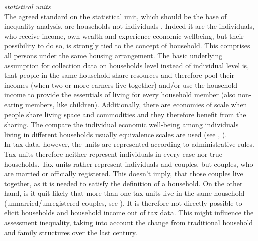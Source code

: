 \documentclass[twoside]{article}\usepackage[]{graphicx}\usepackage[]{color}
\begin{document}
\begin{multicols}{2}


\emph{statistical units} \\

The agreed standard on the statistical unit, which should be the base of inequality analysis, are households not individuals \citep[60]{oecd_oecd_2013 UNSICHER}. Indeed it are the individuals, who receive income, own wealth and experience economic wellbeing, but their possibility to do so, is strongly tied to the concept of household. This comprises all persons under the same housing arrangement. The basic underlying assumption for collection data on households level instead of individual level is, that people in the same household share resources and therefore pool their incomes (when two or more earners live together) and/or use the household income to provide the essentials of living for every household member (also non-earing members, like children). Additionally, there are economies of scale when people share living space and commodities and they therefore benefit from the sharing. The compare the individual economic well-being among individuals living in different households usually equivalence scales are used (see \citealt[173]{oecd_oecd_2013 UNSICHER}, \citealt{Buhmann et al., 1998 FEHLT}). \\

In tax data, however, the units are represented according to administrative rules. Tax units therefore neither represent individuals in every case nor true households. Tax units rather represent individuals and couples, but couples, who are married or officially registered. This doesn't imply, that those couples live together, as it is needed to satisfy the definition of a household. On the other hand, is it quit likely that more than one tax units live in the same household (unmarried/unregistered couples, see \citet[99]{muller_vermogenslage_2014}). It is therefore not directly possible to elicit households and household income out of tax data. This might influence the assessment inequality, taking into account the change from traditional household and family structures over the last century. 




\end{multicols}
\end{document}
